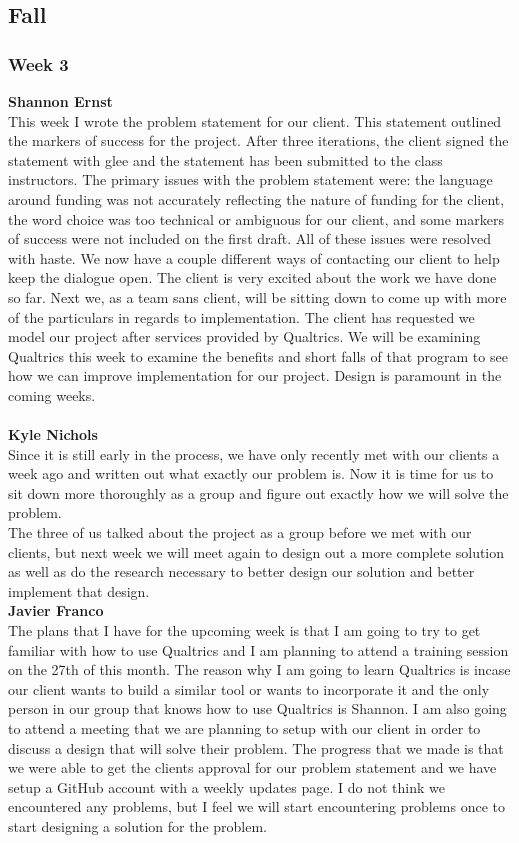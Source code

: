 \documentclass[../final.tex]{subfiles}
\begin{document}
\subsection{Fall}
\subsubsection{Week 3}
\textbf{Shannon Ernst}\\ 
This week I wrote the problem statement for our client. This statement outlined the markers of success for the project. After three iterations, the client signed the statement with glee and the statement has been submitted to the class instructors. The primary issues with the problem statement were: the language around funding was not accurately reflecting the nature of funding for the client, the word choice was too technical or ambiguous for our client, and some markers of success were not included on the first draft. All of these issues were resolved with haste. We now have a couple different ways of contacting our client to help keep the dialogue open. The client is very excited about the work we have done so far. Next we, as a team sans client, will be sitting down to come up with more of the particulars in regards to implementation. The client has requested we model our project after services provided by Qualtrics. We will be examining Qualtrics this week to examine the benefits and short falls of that program to see how we can improve implementation for our project. Design is paramount in the coming weeks.\\ \\
\textbf{Kyle Nichols}\\ 
Since it is still early in the process, we have only recently met with our clients a week ago and written out what exactly our problem is. Now it is time for us to sit down more thoroughly as a group and figure out exactly how we will solve the problem.\\

The three of us talked about the project as a group before we met with our clients, but next week we will meet again to design out a more complete solution as well as do the research necessary to better design our solution and better implement that design.\\

\textbf{Javier Franco} \\ 
The plans that I have for the upcoming week is that I am going to try to get familiar with how to use Qualtrics and I am planning to attend a training session on the 27th of this month. The reason why I am going to learn Qualtrics is incase our client wants to build a similar tool or wants to incorporate it and the only person in our group that knows how to use Qualtrics is Shannon. I am also going to attend a meeting that we are planning to setup with our client in order to discuss a design that will solve their problem. The progress that we made is that we were able to get the clients approval for our problem statement and we have setup a GitHub account with a weekly updates page. I do not think we encountered any problems, but I feel we will start encountering problems once to start designing a solution for the problem.\\
\end{document}
